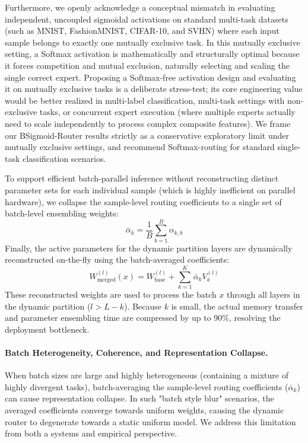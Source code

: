 Furthermore, we openly acknowledge a conceptual mismatch in evaluating independent, uncoupled sigmoidal activations on standard multi-task datasets (such as MNIST, FashionMNIST, CIFAR-10, and SVHN) where each input sample belongs to exactly one mutually exclusive task. In this mutually exclusive setting, a Softmax activation is mathematically and structurally optimal because it forces competition and mutual exclusion, naturally selecting and scaling the single correct expert. Proposing a Softmax-free activation design and evaluating it on mutually exclusive tasks is a deliberate stress-test; its core engineering value would be better realized in multi-label classification, multi-task settings with non-exclusive tasks, or concurrent expert execution (where multiple experts actually need to scale independently to process complex composite features). We frame our BSigmoid-Router results strictly as a conservative exploratory limit under mutually exclusive settings, and recommend Softmax-routing for standard single-task classification scenarios.

To support efficient batch-parallel inference without reconstructing distinct parameter sets for each individual sample (which is highly inefficient on parallel hardware), we collapse the sample-level routing coefficients to a single set of batch-level ensembling weights:
\begin{equation}
    \bar{\alpha}_k = \frac{1}{B} \sum_{b=1}^B \alpha_{k, b}
\end{equation}
Finally, the active parameters for the dynamic partition layers are dynamically reconstructed on-the-fly using the batch-averaged coefficients:
\begin{equation}
    W_{\text{merged}}^{(l)}(x) = W_{\text{base}}^{(l)} + \sum_{k=1}^K \bar{\alpha}_k V_k^{(l)}
\end{equation}
These reconstructed weights are used to process the batch $x$ through all layers in the dynamic partition ($l > L-k$). Because $k$ is small, the actual memory transfer and parameter ensembling time are compressed by up to 90\%, resolving the deployment bottleneck.

\paragraph{Batch Heterogeneity, Coherence, and Representation Collapse.}
When batch sizes are large and highly heterogeneous (containing a mixture of highly divergent tasks), batch-averaging the sample-level routing coefficients ($\bar{\alpha}_k$) can cause representation collapse. In such "batch style blur" scenarios, the averaged coefficients converge towards uniform weights, causing the dynamic router to degenerate towards a static uniform model. We address this limitation from both a systems and empirical perspective.

